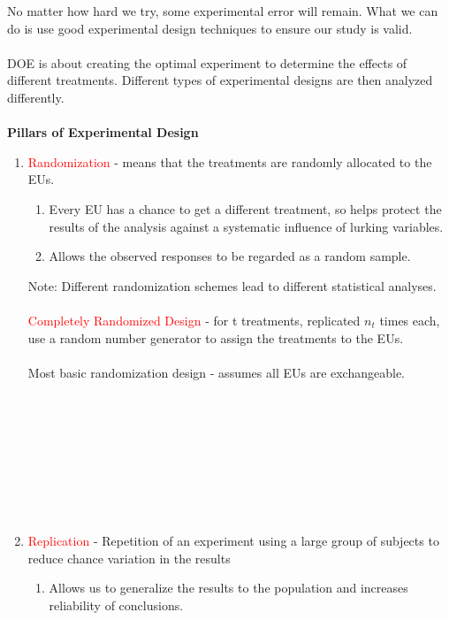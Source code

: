 \documentclass{report}
\begin{document}
No matter how hard we try, some experimental error will remain. What we can do is use good experimental design techniques to ensure our study is valid.\\~\\
DOE is about creating the optimal experiment to determine the effects of different treatments.  Different types of experimental designs are then analyzed differently.\\~\\
\textbf{Pillars of Experimental Design}\\
\begin{enumerate}
		\item 
		\textcolor{red}{Randomization}
		- means that the treatments are randomly allocated to the EUs.
			\begin{enumerate}
				\item Every EU has a chance to get a different treatment, so helps protect the results of the analysis against a systematic influence of lurking variables.  
				\item Allows the observed responses to be regarded as a random sample.
			\end{enumerate}
		Note: Different randomization schemes lead to different statistical analyses.\\~\\
		\textcolor{red}{Completely Randomized Design}
		- for t treatments, replicated $n_t$ times each, use a random number generator to assign the treatments to the EUs.\\~\\
		Most basic randomization design - assumes all EUs are exchangeable.\\~\\~\\~\\~\\~\\~\\~\\~\\
		\item 
		\textcolor{red}{Replication}
		- Repetition of an experiment using a large group of subjects to reduce chance variation in the results
\begin{enumerate}
				\item Allows us to generalize the results to the population and increases reliability of conclusions. 

\end{enumerate}
\end{enumerate}
\end{document}
